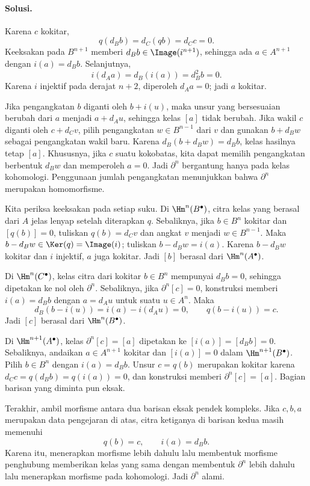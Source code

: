 \paragraph{Solusi.}
\hypertarget{o014.mastery.diagram-chasing.001.sol08}{ }
Karena $c$ kokitar,
\[
	q(d_Bb)=d_C(qb)=d_Cc=0.
\]
Keeksakan pada $B^{n+1}$ memberi
$d_Bb\in\Image(i^{n+1})$, sehingga ada $a\in A^{n+1}$ dengan
$i(a)=d_Bb$. Selanjutnya,
\[
	i(d_Aa)=d_B(i(a))=d_B^2b=0.
\]
Karena $i$ injektif pada derajat $n+2$, diperoleh $d_Aa=0$; jadi $a$
kokitar.

Jika pengangkatan $b$ diganti oleh $b+i(u)$, maka unsur yang bersesuaian
berubah dari $a$ menjadi $a+d_Au$, sehingga kelas $[a]$ tidak berubah.
Jika wakil $c$ diganti oleh $c+d_Cv$, pilih pengangkatan $w\in B^{n-1}$
dari $v$ dan gunakan $b+d_Bw$ sebagai pengangkatan wakil baru. Karena
$d_B(b+d_Bw)=d_Bb$, kelas hasilnya tetap $[a]$. Khususnya, jika $c$ suatu
kokobatas, kita dapat memilih pengangkatan berbentuk $d_Bw$ dan memperoleh
$a=0$. Jadi $\partial^n$ bergantung hanya pada kelas kohomologi. Penggunaan
jumlah pengangkatan menunjukkan bahwa $\partial^n$ merupakan homomorfisme.

Kita periksa keeksakan pada setiap suku. Di $\Hm^n(B^\bullet)$,
citra kelas yang berasal dari $A$ jelas lenyap setelah diterapkan $q$.
Sebaliknya, jika
$b\in B^n$ kokitar dan $[q(b)]=0$, tuliskan
$q(b)=d_Cv$ dan angkat $v$ menjadi $w\in B^{n-1}$. Maka
$b-d_Bw\in\Ker(q)=\Image(i)$; tuliskan $b-d_Bw=i(a)$. Karena $b-d_Bw$
kokitar dan $i$ injektif, $a$ juga kokitar. Jadi $[b]$ berasal dari
$\Hm^n(A^\bullet)$.

Di $\Hm^n(C^\bullet)$, kelas citra dari kokitar $b\in B^n$ mempunyai
$d_Bb=0$, sehingga dipetakan ke nol oleh $\partial^n$. Sebaliknya, jika
$\partial^n[c]=0$, konstruksi memberi $i(a)=d_Bb$ dengan $a=d_Au$ untuk
suatu $u\in A^n$. Maka
\[
	d_B(b-i(u))=i(a)-i(d_Au)=0,
	\qquad q(b-i(u))=c.
\]
Jadi $[c]$ berasal dari $\Hm^n(B^\bullet)$.

Di $\Hm^{n+1}(A^\bullet)$, kelas $\partial^n[c]=[a]$ dipetakan ke
$[i(a)]=[d_Bb]=0$. Sebaliknya, andaikan $a\in A^{n+1}$ kokitar dan
$[i(a)]=0$ dalam $\Hm^{n+1}(B^\bullet)$. Pilih $b\in B^n$ dengan
$i(a)=d_Bb$. Unsur $c=q(b)$ merupakan kokitar karena
$d_Cc=q(d_Bb)=q(i(a))=0$, dan konstruksi memberi
$\partial^n[c]=[a]$. Bagian barisan yang diminta pun eksak.

Terakhir, ambil morfisme antara dua barisan eksak pendek kompleks. Jika
$c,b,a$ merupakan data pengejaran di atas, citra ketiganya di barisan kedua
masih memenuhi
\[
	q(b)=c,\qquad i(a)=d_Bb.
\]
Karena itu, menerapkan morfisme lebih dahulu lalu membentuk morfisme
penghubung memberikan kelas yang sama dengan membentuk $\partial^n$ lebih
dahulu lalu menerapkan morfisme pada kohomologi. Jadi $\partial^n$ alami.

